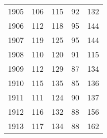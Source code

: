 \documentclass[leqno]{article}  %
\begin{document}
\begin{table}
{\begin{tabular}{p{}|p{}|p{}|p{}|p{}}
1905 & \hfill 106 \hspace*{6mm} & \hfill 115 \hspace*{6mm} & \hfill 92 \hspace*{6mm} & \hfill 132 \hspace*{6mm} \\
1906 & \hfill 112 \hspace*{6mm} & \hfill 118 \hspace*{6mm} & \hfill 95 \hspace*{6mm} & \hfill 144 \hspace*{6mm} \\
1907 & \hfill 119 \hspace*{6mm} & \hfill 125 \hspace*{6mm} & \hfill 95 \hspace*{6mm} & \hfill 144 \hspace*{6mm} \\
1908 & \hfill 110 \hspace*{6mm} & \hfill 120 \hspace*{6mm} & \hfill 91 \hspace*{6mm} & \hfill 115 \hspace*{6mm} \\
1909 & \hfill 112 \hspace*{6mm} & \hfill 129 \hspace*{6mm} & \hfill 87 \hspace*{6mm} & \hfill 134 \hspace*{6mm} \\
1910 & \hfill 115 \hspace*{6mm} & \hfill 135 \hspace*{6mm} & \hfill 85 \hspace*{6mm} & \hfill 136 \hspace*{6mm} \\
1911 & \hfill 111 \hspace*{6mm} & \hfill 124 \hspace*{6mm} & \hfill 90 \hspace*{6mm} & \hfill 137 \hspace*{6mm} \\
1912 & \hfill 116 \hspace*{6mm} & \hfill 132 \hspace*{6mm} & \hfill 88 \hspace*{6mm} & \hfill 156 \hspace*{6mm} \\
1913 & \hfill 117 \hspace*{6mm} & \hfill 134 \hspace*{6mm} & \hfill 88 \hspace*{6mm} & \hfill 162 \hspace*{6mm} \\

\end{tabular}}
\end{table}
\end{document}
